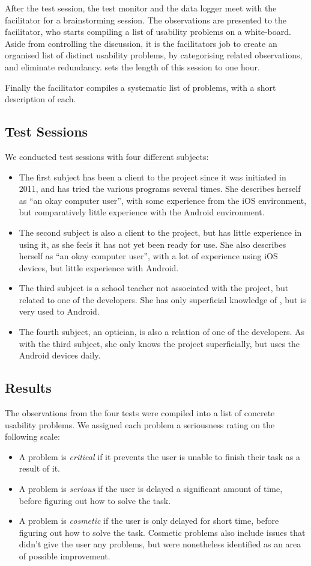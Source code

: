 After the test session, the test monitor and the data logger meet with the facilitator for a brainstorming session. The observations are presented to the facilitator, who starts compiling a list of usability problems on a white-board. Aside from controlling the discussion, it is the facilitators job to create an organised list of distinct usability problems, by categorising related observations, and eliminate redundancy. \citet{idaArticle} sets the length of this session to one hour. 

Finally the facilitator compiles a systematic list of problems, with a short description of each.

\subsection{Test Sessions}
We conducted test sessions with four different subjects:
\begin{itemize}
	\item The first subject has been a client to the \giraf project since it was initiated in 2011, and has tried the various programs several times. She describes herself as ``an okay computer user'', with some experience from the iOS environment, but comparatively little experience with the Android environment. 
	\item The second subject is also a client to the \giraf project, but has little experience in using it, as she feels it has not yet been ready for use. She also describes herself as ``an okay computer user'', with a lot of experience using iOS devices, but little experience with Android. 
	\item The third subject is a school teacher not associated with the \giraf project, but related to one of the developers. She has only superficial knowledge of \giraf, but is very used to Android.
	\item The fourth subject, an optician, is also a relation of one of the developers. As with the third subject, she only knows the \giraf project superficially, but uses the Android devices daily.
\end{itemize}

\subsection{Results}
The observations from the four tests were compiled into a list of concrete usability problems. We assigned each problem a seriousness rating on the following scale:
\begin{itemize}
	\item A problem is \textit{critical} if it prevents the user is unable to finish their task as a result of it.
	\item A problem is \textit{serious} if the user is delayed a significant amount of time, before figuring out how to solve the task.
	\item A problem is \textit{cosmetic} if the user is only delayed for short time, before figuring out how to solve the task. Cosmetic problems also include issues that didn't give the user any problems, but were nonetheless identified as an area of possible improvement.
\end{itemize}

